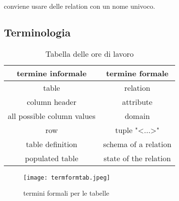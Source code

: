 conviene usare delle relation con un nome univoco.


\subsection{Terminologia}


\begin{table}[h!]
	\begin{center}
		\begin{tabular}{|c | c|} 
			\hline
			termine informale & termine formale \\ [0.5ex]
			\hline
 			table & relation \\
			column header & attribute \\
			all possible column values & domain \\
			row & tuple "<...>" \\\hline
			table definition & schema of a relation \\
			populated table & state of the relation \\
			\hline
		\end{tabular}
	\end{center}
	\caption{Tabella delle ore di lavoro}
	\label{taborelav}
\end{table}


\begin{figure}[H]
\centering
\texttt{[image: termformtab.jpeg]}
\caption{termini formali per le tabelle} 
\label{termformtab}
\end{figure}

